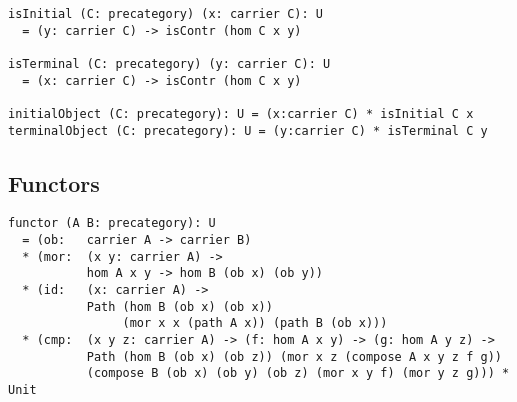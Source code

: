 \documentclass{article}
\begin{document}
\begin{lstlisting}[mathescape=true]
isInitial (C: precategory) (x: carrier C): U
  = (y: carrier C) -> isContr (hom C x y)

isTerminal (C: precategory) (y: carrier C): U
  = (x: carrier C) -> isContr (hom C x y)

initialObject (C: precategory): U = (x:carrier C) * isInitial C x
terminalObject (C: precategory): U = (y:carrier C) * isTerminal C y
\end{lstlisting}

\subsection{Functors}

\begin{lstlisting}[mathescape=true]
functor (A B: precategory): U
  = (ob:   carrier A -> carrier B)
  * (mor:  (x y: carrier A) ->
           hom A x y -> hom B (ob x) (ob y))
  * (id:   (x: carrier A) ->
           Path (hom B (ob x) (ob x))
                (mor x x (path A x)) (path B (ob x)))
  * (cmp:  (x y z: carrier A) -> (f: hom A x y) -> (g: hom A y z) ->
           Path (hom B (ob x) (ob z)) (mor x z (compose A x y z f g))
           (compose B (ob x) (ob y) (ob z) (mor x y f) (mor y z g))) * Unit
\end{lstlisting}



\end{document}
